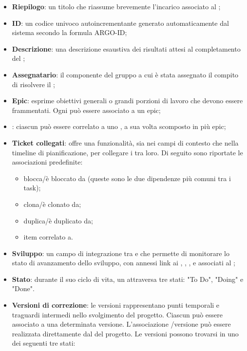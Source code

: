 \begin{itemize}
  \item \textbf{Riepilogo}: un titolo che riassume brevemente l'incarico associato al ;
  \item \textbf{ID}: un codice univoco autoincrementante generato automaticamente dal sistema secondo la formula ARGO-ID;
  \item \textbf{Descrizione}: una descrizione esaustiva dei risultati attesi al completamento del ;
  \item \textbf{Assegnatario}: il componente del gruppo a cui è stata assegnato il compito di risolvere il ;
  \item \textbf{Epic}: esprime obiettivi generali o grandi porzioni di lavoro che devono essere frammentati. Ogni  può essere associato a un epic;
  \item \textbf{}: ciascun  può essere correlato a uno , a sua volta scomposto in più epic;
  \item \textbf{Ticket collegati}:  offre una funzionalità, sia nei campi di contesto che nella timeline di pianificazione, per collegare i  tra loro. Di seguito sono riportate le associazioni predefinite:
    \begin{itemize}
      \item blocca/è bloccato da (queste sono le due dipendenze più comuni tra i task);
      \item clona/è clonato da;
      \item duplica/è duplicato da;
      \item item correlato a.
    \end{itemize} 
  \item \textbf{Sviluppo}: un campo di integrazione tra  e  che permette di monitorare lo stato di avanzamento dello sviluppo, con annessi link ai , , ,  e  associati al ;
  \item \textbf{Stato}: durante il suo ciclo di vita, un  attraversa tre stati: "To Do", "Doing" e "Done".
  \item \textbf{Versioni di correzione}: le versioni rappresentano punti temporali e traguardi intermedi nello svolgimento del progetto. Ciascun  può essere associato a una determinata versione. L'associazione /versione può essere realizzata direttamente dal  del progetto. Le versioni possono trovarsi in uno dei seguenti tre stati:

\end{itemize}
